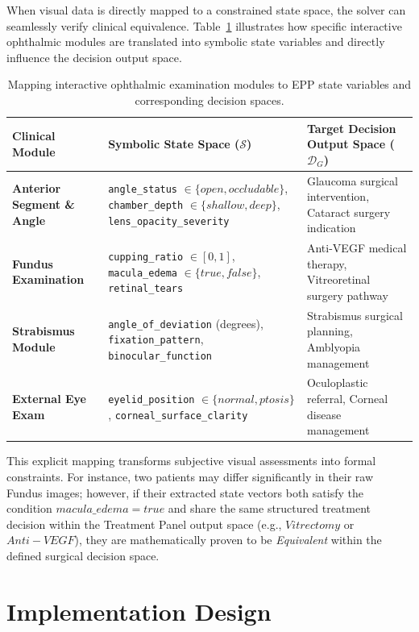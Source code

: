 \documentclass[english,5p,twocolumn,preprint]{elsarticle}
\newcommand{\Dec}{\mathcal{D}}
\newcommand{\State}{\mathcal{S}}
\begin{document}
When visual data is directly mapped to a constrained state space, the solver can seamlessly verify clinical equivalence. Table~\ref{tab:visual_abstraction} illustrates how specific interactive ophthalmic modules are translated into symbolic state variables and directly influence the decision output space.

\begin{table}[ht!]
\centering
\caption{Mapping interactive ophthalmic examination modules to EPP state variables and corresponding decision spaces.}
\label{tab:visual_abstraction}
\begin{tabularx}{\textwidth}{p{}p{}X}
\toprule
\textbf{Clinical Module} & \textbf{Symbolic State Space ($\State$)} & \textbf{Target Decision Output Space ($\Dec_G$)} \\
\midrule
\textbf{Anterior Segment \& Angle} & \texttt{angle\_status} $\in \{open, occludable\}$, \texttt{chamber\_depth} $\in \{shallow, deep\}$, \texttt{lens\_opacity\_severity} & Glaucoma surgical intervention, Cataract surgery indication \\
\addlinespace
\textbf{Fundus Examination} & \texttt{cupping\_ratio} $\in [0,1]$, \texttt{macula\_edema} $\in \{true, false\}$, \texttt{retinal\_tears} & Anti-VEGF medical therapy, Vitreoretinal surgery pathway \\
\addlinespace
\textbf{Strabismus Module} & \texttt{angle\_of\_deviation} (degrees), \texttt{fixation\_pattern}, \texttt{binocular\_function} & Strabismus surgical planning, Amblyopia management \\
\addlinespace
\textbf{External Eye Exam} & \texttt{eyelid\_position} $\in \{normal, ptosis\}$, \texttt{corneal\_surface\_clarity} & Oculoplastic referral, Corneal disease management \\
\bottomrule
\end{tabularx}
\end{table}

This explicit mapping transforms subjective visual assessments into formal constraints. For instance, two patients may differ significantly in their raw Fundus images; however, if their extracted state vectors both satisfy the condition $macula\_edema = true$ and share the same structured treatment decision within the Treatment Panel output space (e.g., $Vitrectomy$ or $Anti-VEGF$), they are mathematically proven to be \emph{Equivalent} within the defined surgical decision space.

\section{Implementation Design}
\end{document}
